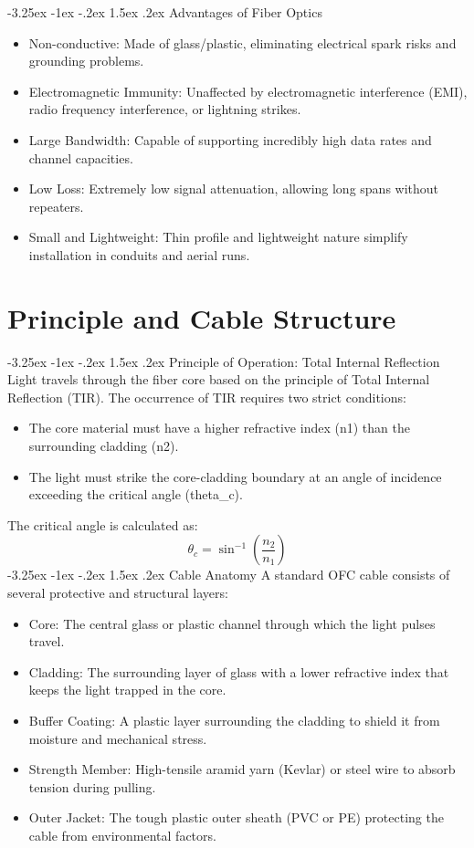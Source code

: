 \documentclass[11pt,a4paper]{report}
\makeatletter
\renewcommand{\section}{\@startsection{section}{1}{\z@}%
  {-3.25ex \@plus -1ex \@minus -.2ex}%
  {1.5ex \@plus.2ex}%
  {\normalfont\Large\bfseries\color{primaryColor}}}
\makeatother
\begin{document}
\section{Advantages of Fiber Optics}
\begin{itemize}
  \item Non-conductive: Made of glass/plastic, eliminating electrical spark risks and grounding problems.
  \item Electromagnetic Immunity: Unaffected by electromagnetic interference (EMI), radio frequency interference, or lightning strikes.
  \item Large Bandwidth: Capable of supporting incredibly high data rates and channel capacities.
  \item Low Loss: Extremely low signal attenuation, allowing long spans without repeaters.
  \item Small and Lightweight: Thin profile and lightweight nature simplify installation in conduits and aerial runs.
\end{itemize}
\chapter{Principle and Cable Structure}
\section{Principle of Operation: Total Internal Reflection}
Light travels through the fiber core based on the principle of Total Internal Reflection (TIR). The occurrence of TIR requires two strict conditions:
\begin{itemize}
  \item The core material must have a higher refractive index (n1) than the surrounding cladding (n2).
  \item The light must strike the core-cladding boundary at an angle of incidence exceeding the critical angle (theta\_c).
\end{itemize}
The critical angle is calculated as:
\begin{equation}\theta_c = \sin^{-1}\left( \frac{n_2}{n_1} \right)\end{equation}
\section{Cable Anatomy}
A standard OFC cable consists of several protective and structural layers:
\begin{itemize}
  \item Core: The central glass or plastic channel through which the light pulses travel.
  \item Cladding: The surrounding layer of glass with a lower refractive index that keeps the light trapped in the core.
  \item Buffer Coating: A plastic layer surrounding the cladding to shield it from moisture and mechanical stress.
  \item Strength Member: High-tensile aramid yarn (Kevlar) or steel wire to absorb tension during pulling.
  \item Outer Jacket: The tough plastic outer sheath (PVC or PE) protecting the cable from environmental factors.
\end{itemize}
\end{document}
